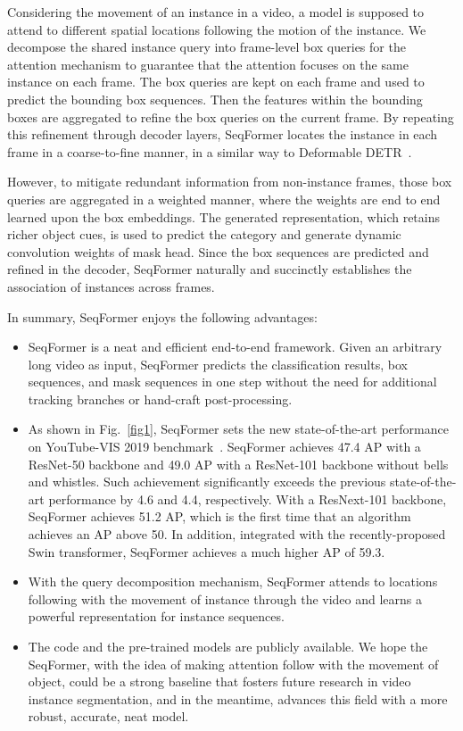 \documentclass[runningheads]{llncs}
\begin{document}
Considering the movement of an instance in a video, a model is supposed to attend to different spatial locations following the motion of the instance.
We decompose the shared instance query into frame-level box queries for the attention mechanism to guarantee that the attention focuses on the same instance on each frame.
The box queries are kept on each frame and used to predict the bounding box sequences. Then the features within the bounding boxes are aggregated to refine the box queries on the current frame.
By repeating this refinement through decoder layers, SeqFormer locates the instance in each frame in a coarse-to-fine manner, in a similar way to Deformable DETR~\cite{deformableDETR}.


However, to mitigate redundant information from non-instance frames, those box queries are aggregated in a weighted manner, where the weights are end to end learned upon the box embeddings. The generated representation, which retains richer object cues, is used to predict the category and generate dynamic convolution weights of mask head.
Since the box sequences are predicted and refined in the decoder, SeqFormer naturally and succinctly establishes the association of instances across frames.

In summary, SeqFormer enjoys the following advantages:
\begin{itemize}
\item SeqFormer is a neat and efficient end-to-end framework. Given an arbitrary long video as input, SeqFormer predicts the classification results, box sequences, and mask sequences in one step without the need for additional tracking branches or hand-craft post-processing.

\item As shown in Fig.~\ref{fig1}, SeqFormer sets the new state-of-the-art performance on YouTube-VIS 2019 benchmark~\cite{yang2019video}. SeqFormer achieves 47.4 AP with a ResNet-50 backbone and 49.0 AP with a ResNet-101 backbone without bells and whistles. Such achievement significantly exceeds the previous state-of-the-art performance by 4.6 and 4.4, respectively. With a ResNext-101 backbone, SeqFormer achieves 51.2 AP, which is the first time that an algorithm achieves an AP above 50. In addition, integrated with the recently-proposed Swin transformer, SeqFormer achieves a much higher AP of 59.3.  
\item With the query decomposition mechanism, SeqFormer attends to locations following with the movement of instance through the video and learns a powerful representation for instance sequences.
\item The code and the pre-trained models are publicly available. We hope the SeqFormer, with the idea of making attention follow with the movement of object, could be a strong baseline that fosters future research in video instance segmentation, and in the meantime, advances this field with a more robust, accurate, neat model. 
\end{itemize}
\end{document}
